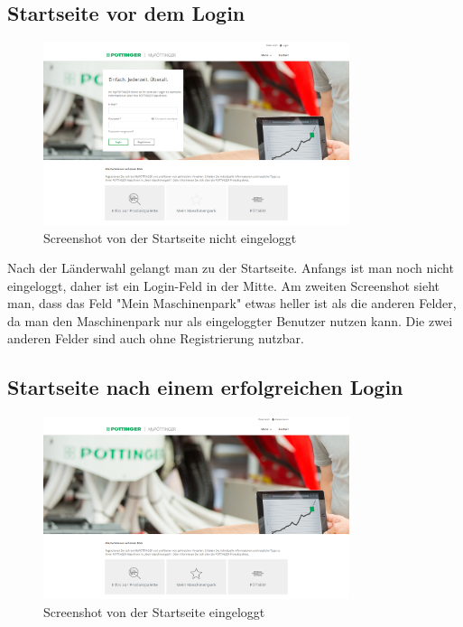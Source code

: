 \subsection{Startseite vor dem Login}
\begin{figure}[H]
	\centerline{
		\includegraphics[width=0.8\textwidth]{./grafiken/erm_home_not_logged_in_1.png}
	}
	\vskip0pt
	\caption{Screenshot von der Startseite nicht eingeloggt} \label{fig:homeNotLoggedIn}
\end{figure}

Nach der Länderwahl gelangt man zu der Startseite. Anfangs ist man noch nicht eingeloggt, daher ist ein Login-Feld in der Mitte. Am zweiten Screenshot sieht man, dass das Feld "Mein Maschinenpark" etwas heller ist als die anderen Felder, da man den Maschinenpark nur als eingeloggter Benutzer nutzen kann. Die zwei anderen Felder sind auch ohne Registrierung nutzbar.
 
\subsection{Startseite nach einem erfolgreichen Login}
\begin{figure}[H]
	\centerline{
		\includegraphics[width=0.8\textwidth]{./grafiken/erm_home_logged_in.png}
	}
	\vskip0pt
	\caption{Screenshot von der Startseite eingeloggt} \label{fig:homeLoggedIn}
\end{figure}

